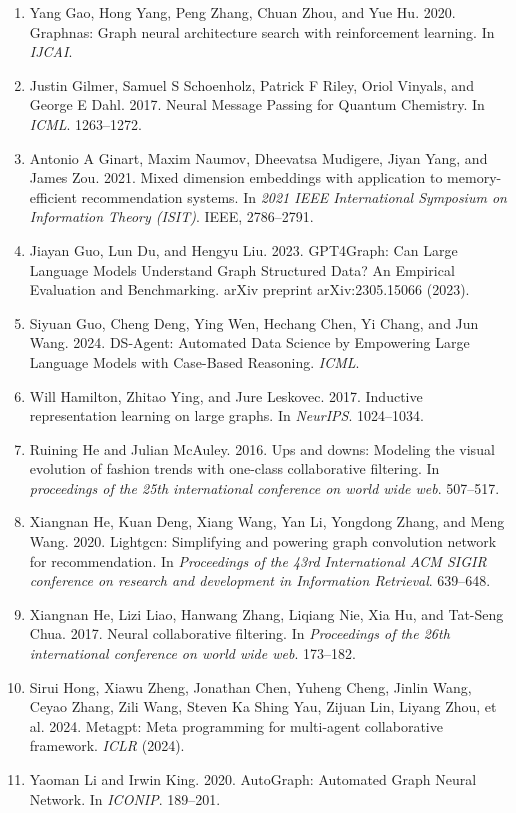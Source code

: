 \documentclass[11pt,UTF8,fontset=fandol]{ctexart}
\begin{document}
\begin{enumerate}[leftmargin=2em,labelsep=0.5em]
\item Yang Gao, Hong Yang, Peng Zhang, Chuan Zhou, and Yue Hu. 2020. Graphnas: Graph neural architecture search with reinforcement learning. In \textit{IJCAI}.
\item Justin Gilmer, Samuel S Schoenholz, Patrick F Riley, Oriol Vinyals, and George E Dahl. 2017. Neural Message Passing for Quantum Chemistry. In \textit{ICML}. 1263--1272.
\item Antonio A Ginart, Maxim Naumov, Dheevatsa Mudigere, Jiyan Yang, and James Zou. 2021. Mixed dimension embeddings with application to memory-efficient recommendation systems. In \textit{2021 IEEE International Symposium on Information Theory (ISIT)}. IEEE, 2786--2791.
\item Jiayan Guo, Lun Du, and Hengyu Liu. 2023. GPT4Graph: Can Large Language Models Understand Graph Structured Data? An Empirical Evaluation and Benchmarking. arXiv preprint arXiv:2305.15066 (2023).
\item Siyuan Guo, Cheng Deng, Ying Wen, Hechang Chen, Yi Chang, and Jun Wang. 2024. DS-Agent: Automated Data Science by Empowering Large Language Models with Case-Based Reasoning. \textit{ICML}.
\item Will Hamilton, Zhitao Ying, and Jure Leskovec. 2017. Inductive representation learning on large graphs. In \textit{NeurIPS}. 1024--1034.
\item Ruining He and Julian McAuley. 2016. Ups and downs: Modeling the visual evolution of fashion trends with one-class collaborative filtering. In \textit{proceedings of the 25th international conference on world wide web}. 507--517.
\item Xiangnan He, Kuan Deng, Xiang Wang, Yan Li, Yongdong Zhang, and Meng Wang. 2020. Lightgcn: Simplifying and powering graph convolution network for recommendation. In \textit{Proceedings of the 43rd International ACM SIGIR conference on research and development in Information Retrieval}. 639--648.
\item Xiangnan He, Lizi Liao, Hanwang Zhang, Liqiang Nie, Xia Hu, and Tat-Seng Chua. 2017. Neural collaborative filtering. In \textit{Proceedings of the 26th international conference on world wide web}. 173--182.
\item Sirui Hong, Xiawu Zheng, Jonathan Chen, Yuheng Cheng, Jinlin Wang, Ceyao Zhang, Zili Wang, Steven Ka Shing Yau, Zijuan Lin, Liyang Zhou, et al. 2024. Metagpt: Meta programming for multi-agent collaborative framework. \textit{ICLR} (2024).
\item Yaoman Li and Irwin King. 2020. AutoGraph: Automated Graph Neural Network. In \textit{ICONIP}. 189--201.

\end{enumerate}
\end{document}
